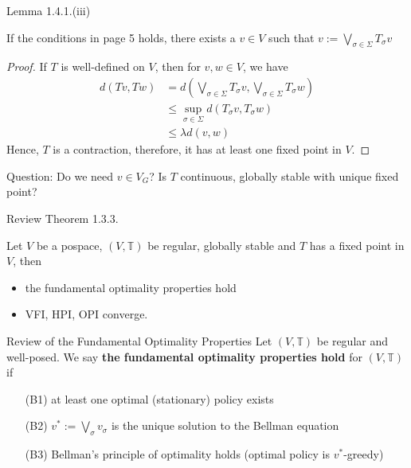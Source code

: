 \documentclass[aspectratio=169]{beamer} %
\begin{document}
\begin{frame}{Lemma 1.4.1.(iii)}
    \begin{lemma}
        If the conditions in page 5 holds, there exists a $v\in V$ such that $v:=\bigvee_{\sigma\in \Sigma} T_\sigma v$
    \end{lemma}
    
    \begin{proof}
        If $T$ is well-defined on $V$, then for $v,w \in V$, we have 
        \begin{align*}
            d(Tv,Tw) &= d\left(\bigvee_{\sigma\in\Sigma} T_\sigma v, \bigvee_{\sigma\in\Sigma} T_\sigma w \right)\\
            &\le \sup_{\sigma\in\Sigma} d(T_\sigma v,T_\sigma w)\tag{sup-nonexpansionary}\\
            &\le \lambda d(v,w)\tag{contraction}
        \end{align*}
        Hence, $T$ is a contraction, therefore, it has at least one fixed point in $V$.
    \end{proof}
    Question: Do we need $v\in V_G$? Is $T$ continuous, globally stable with unique fixed point?
\end{frame}
\begin{frame}{Review Theorem 1.3.3.}
\begin{theorem}
    Let $V$ be a pospace, $(V,\mathbb{T})$ be regular, globally stable and $T$ has a fixed point in $V$, then
    \begin{itemize}
        \item the fundamental optimality properties hold
        \item VFI, HPI, OPI converge.
    \end{itemize}
\end{theorem}
\end{frame}

\begin{frame}{Review of the Fundamental Optimality Properties}
Let $(V,\mathbb{T})$ be regular and well-posed. We say \textbf{the fundamental optimality properties hold} for $(V,\mathbb{T})$ if
\begin{enumerate}
    \item[(B1)] at least one optimal (stationary) policy exists
    \item[(B2)] $v^*:=\bigvee_{\sigma} v_\sigma$ is the unique solution to the Bellman equation
    \item[(B3)] Bellman's principle of optimality holds (optimal policy is $v^*$-greedy)
\end{enumerate}
    
\end{frame}
\end{document}
